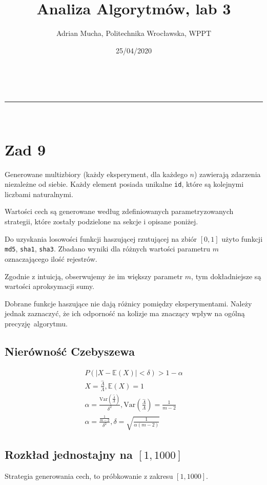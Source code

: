 \documentclass[a4paper,11pt]{article}
\makeatletter
\newcommand{\linia}{\rule{\linewidth}{0.5pt}}
\theoremstyle{mytheor}
\renewcommand{\maketitle}{
\begin{center}
\vspace{2ex}
{\huge \textsc{\@title}}
\vspace{1ex}
\\
\linia\\
\@author \hfill \@date
\vspace{4ex}
\end{center}
}
\makeatother
\begin{document}
\title{Analiza Algorytmów, lab 3}

\author{Adrian Mucha, Politechnika Wrocławska, WPPT}

\date{25/04/2020}

\maketitle

\section*{Zad 9}

Generowane multizbiory (każdy eksperyment, dla każdego $n$) zawierają zdarzenia niezależne od siebie. Każdy element posiada unikalne \texttt{id}, które są kolejnymi liczbami naturalnymi.

Wartości cech są generowane według zdefiniowanych parametryzowanych strategii, które zostały podzielone na sekcje i opisane poniżej.

Do uzyskania losowości funkcji haszującej rzutującej na zbiór $[0, 1]$ użyto funkcji \texttt{md5}, \texttt{sha1}, \texttt{sha3}. Zbadano wyniki dla różnych wartości parametru $m$ oznaczającego ilość rejestrów.

Zgodnie z intuicją, obserwujemy że im większy parametr $m$, tym dokładniejsze są wartości aproksymacji sumy.

Dobrane funkcje haszujące nie dają różnicy pomiędzy eksperymentami. Należy jednak zaznaczyć, że ich odporność na kolizje ma znaczący wpływ na ogólną precyzję algorytmu.

\subsection*{Nierówność Czebyszewa}
\begin{gather*}
    P(|X - \mathbb{E}(X)| < \delta) > 1 - \alpha \\
    X = \frac{\hat{\Lambda}}{\Lambda}, \mathbb{E}(X) = 1 \\
    \alpha = \frac{\text{Var}(\frac{\hat{\Lambda}}{\Lambda})}{\delta^2}, 
    \text{Var}(\frac{\hat{\Lambda}}{\Lambda}) = \frac{1}{m - 2} \\
    \alpha = \frac{\frac{1}{m - 2}}{\delta^2}, 
    \delta = \sqrt{\frac{1}{\alpha(m - 2)}}
\end{gather*}


\subsection*{Rozkład jednostajny na $[1, 1000]$}
Strategia generowania cech, to próbkowanie z zakresu $[1, 1000]$.

\end{document}
